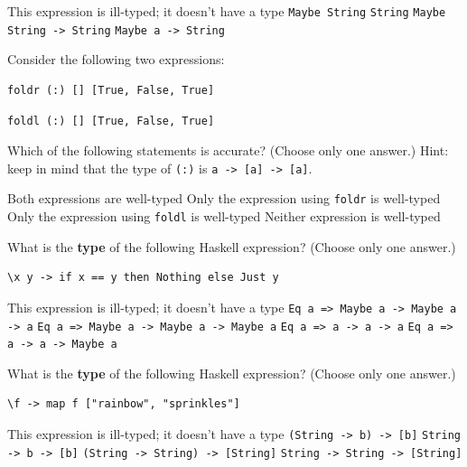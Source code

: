 \documentclass[addpoints]{exam}
\begin{document}
\begin{questions}
\begin{checkboxes}
  \choice This expression is ill-typed; it doesn't have a type
  \choice \verb|Maybe String|
  \choice \verb|String|
  \choice \verb|Maybe String -> String|
  \CorrectChoice \verb|Maybe a -> String|
\end{checkboxes}

\question[6] Consider the following two expressions:

\begin{verbatim}
foldr (:) [] [True, False, True]
\end{verbatim}
\begin{verbatim}
foldl (:) [] [True, False, True]
\end{verbatim}

Which of the following statements is accurate? (Choose only one answer.)  Hint: keep in mind that the type of \verb|(:)| is \verb|a -> [a] -> [a]|.

\begin{checkboxes}
  \choice Both expressions are well-typed
  \CorrectChoice Only the expression using \verb|foldr| is well-typed
  \choice Only the expression using \verb|foldl| is well-typed
  \choice Neither expression is well-typed
\end{checkboxes}

\question[6] What is the \textbf{type} of the following Haskell expression? (Choose only one answer.)

\begin{verbatim}
\x y -> if x == y then Nothing else Just y
\end{verbatim}

\begin{checkboxes}
  \choice This expression is ill-typed; it doesn't have a type
  \choice \verb|Eq a => Maybe a -> Maybe a -> a|
  \choice \verb|Eq a => Maybe a -> Maybe a -> Maybe a|
  \choice \verb|Eq a => a -> a -> a|
  \CorrectChoice \verb|Eq a => a -> a -> Maybe a|
\end{checkboxes}

\question[6] What is the \textbf{type} of the following Haskell expression? (Choose only one answer.)

\begin{verbatim}
\f -> map f ["rainbow", "sprinkles"]
\end{verbatim}

\begin{checkboxes}
  \choice This expression is ill-typed; it doesn't have a type
  \CorrectChoice \verb|(String -> b) -> [b]|
  \choice \verb|String -> b -> [b]|
  \choice \verb|(String -> String) -> [String]|
  \choice \verb|String -> String -> [String]|
\end{checkboxes}


\end{questions}
\end{document}
